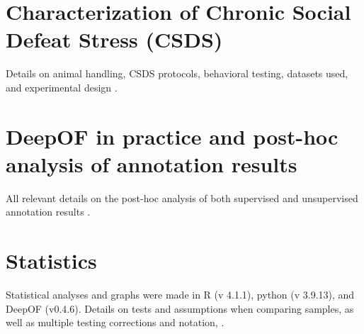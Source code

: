 \section{Characterization of Chronic Social Defeat Stress (CSDS)}

Details on animal handling, CSDS protocols, behavioral testing, datasets used, and experimental design \fullncref. 

\section{DeepOF in practice and post-hoc analysis of annotation results}

All relevant details on the post-hoc analysis of both supervised and unsupervised annotation results \fullncref.

\section{Statistics}

Statistical analyses and graphs were made in R (v 4.1.1), python (v 3.9.13), and DeepOF (v0.4.6). Details on tests and assumptions when comparing samples, as well as multiple testing corrections and notation, \fullncref.